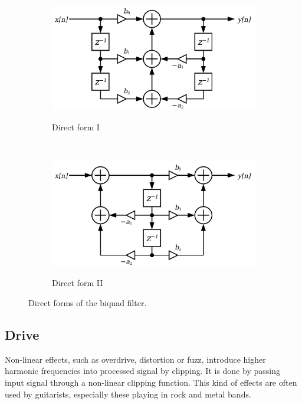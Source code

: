 \documentclass[a4paper,twoside,12pt]{book}
\begin{document}
\begin{figure}[H]
    \centering
    \begin{subfigure}[t]{0.45\textwidth}
        \includegraphics[width=\textwidth]{images/DF1}
        \label{fig:df1}
        \caption{Direct form I}
    \end{subfigure}
    ~
    \begin{subfigure}[t]{0.45\textwidth}
        \includegraphics[width=\textwidth]{images/DF2}
        \label{fig:df2}
        \caption{Direct form II}
    \end{subfigure}
    \caption{Direct forms of the biquad filter.}
    \label{fig:biquad2}
\end{figure}

\subsection{Drive}
Non-linear effects, such as overdrive, distortion or fuzz,
introduce higher harmonic frequencies into processed signal by clipping.
It is done by passing input signal through a non-linear clipping function.
This kind of effects are often used by guitarists,
especially these playing in rock and metal bands.
\end{document}
